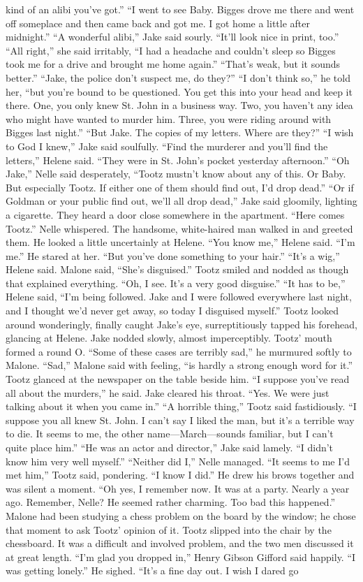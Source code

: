 \documentclass{novel}
\begin{document}
kind of an alibi you’ve got.” “I went to see Baby. Bigges drove me there and went off someplace and then came back and got me. I got home a little after midnight.” “A wonderful alibi,” Jake said sourly. “It’ll look nice in print, too.” “All right,” she said irritably, “I had a headache and couldn’t sleep so Bigges took me for a drive and brought me home again.” “That’s weak, but it sounds better.” “Jake, the police don’t suspect me, do they?” “I don’t think so,” he told her, “but you’re bound to be questioned. You get this into your head and keep it there. One, you only knew St. John in a business way. Two, you haven’t any idea who might have wanted to murder him. Three, you were riding around with Bigges last night.” “But Jake. The copies of my letters. Where are they?” “I wish to God I knew,” Jake said soulfully. “Find the murderer and you’ll find the letters,” Helene said. “They were in St. John’s pocket yesterday afternoon.” “Oh Jake,” Nelle said desperately, “Tootz mustn’t know about any of this. Or Baby. But especially Tootz. If either one of them should find out, I’d drop dead.” “Or if Goldman or your public find out, we’ll all drop dead,” Jake said gloomily, lighting a cigarette. They heard a door close somewhere in the apartment. “Here comes Tootz.” Nelle whispered. The handsome, white-haired man walked in and greeted them. He looked a little uncertainly at Helene. “You know me,” Helene said. “I’m me.” He stared at her. “But you’ve done something to your hair.” “It’s a wig,” Helene said. Malone said, “She’s disguised.” Tootz smiled and nodded as though that explained everything. “Oh, I see. It’s a very good disguise.” “It has to be,” Helene said, “I’m being followed. Jake and I were followed everywhere last night, and I thought we’d never get away, so today I disguised myself.” Tootz looked around wonderingly, finally caught Jake’s eye, surreptitiously tapped his forehead, glancing at Helene. Jake nodded slowly, almost imperceptibly. Tootz’ mouth formed a round O. “Some of these cases are terribly sad,” he murmured softly to Malone. “Sad,” Malone said with feeling, “is hardly a strong enough word for it.” Tootz glanced at the newspaper on the table beside him. “I suppose you’ve read all about the murders,” he said. Jake cleared his throat. “Yes. We were just talking about it when you came in.” “A horrible thing,” Tootz said fastidiously. “I suppose you all knew St. John. I can’t say I liked the man, but it’s a terrible way to die. It seems to me, the other name—March—sounds familiar, but I can’t quite place him.” “He was an actor and director,” Jake said lamely. “I didn’t know him very well myself.” “Neither did I,” Nelle managed. “It seems to me I’d met him,” Tootz said, pondering. “I know I did.” He drew his brows together and was silent a moment. “Oh yes, I remember now. It was at a party. Nearly a year ago. Remember, Nelle? He seemed rather charming. Too bad this happened.” Malone had been studying a chess problem on the board by the window; he chose that moment to ask Tootz’ opinion of it. Tootz slipped into the chair by the chessboard. It was a difficult and involved problem, and the two men discussed it at great length. “I’m glad you dropped in,” Henry Gibson Gifford said happily. “I was getting lonely.” He sighed. “It’s a fine day out. I wish I dared go 
\end{document}
